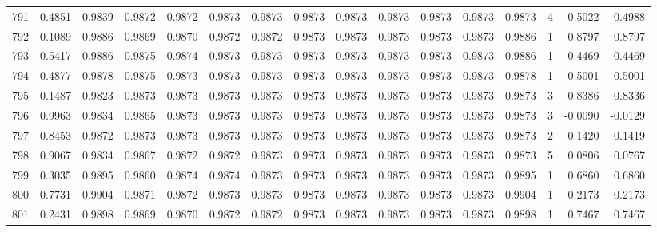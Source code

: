 \begin{tabular}{lrrrrrrrrrrrrrrr}
791 &      0.4851 &  0.9839 &  0.9872 &  0.9872 &  0.9873 &  0.9873 &  0.9873 &  0.9873 &  0.9873 &  0.9873 &   0.9873 &     0.9873 &      4 &                    0.5022 &                     0.4988 \\
792 &      0.1089 &  0.9886 &  0.9869 &  0.9870 &  0.9872 &  0.9872 &  0.9873 &  0.9873 &  0.9873 &  0.9873 &   0.9873 &     0.9886 &      1 &                    0.8797 &                     0.8797 \\
793 &      0.5417 &  0.9886 &  0.9875 &  0.9874 &  0.9873 &  0.9873 &  0.9873 &  0.9873 &  0.9873 &  0.9873 &   0.9873 &     0.9886 &      1 &                    0.4469 &                     0.4469 \\
794 &      0.4877 &  0.9878 &  0.9875 &  0.9873 &  0.9873 &  0.9873 &  0.9873 &  0.9873 &  0.9873 &  0.9873 &   0.9873 &     0.9878 &      1 &                    0.5001 &                     0.5001 \\
795 &      0.1487 &  0.9823 &  0.9873 &  0.9873 &  0.9873 &  0.9873 &  0.9873 &  0.9873 &  0.9873 &  0.9873 &   0.9873 &     0.9873 &      3 &                    0.8386 &                     0.8336 \\
796 &      0.9963 &  0.9834 &  0.9865 &  0.9873 &  0.9873 &  0.9873 &  0.9873 &  0.9873 &  0.9873 &  0.9873 &   0.9873 &     0.9873 &      3 &                   -0.0090 &                    -0.0129 \\
797 &      0.8453 &  0.9872 &  0.9873 &  0.9873 &  0.9873 &  0.9873 &  0.9873 &  0.9873 &  0.9873 &  0.9873 &   0.9873 &     0.9873 &      2 &                    0.1420 &                     0.1419 \\
798 &      0.9067 &  0.9834 &  0.9867 &  0.9872 &  0.9872 &  0.9873 &  0.9873 &  0.9873 &  0.9873 &  0.9873 &   0.9873 &     0.9873 &      5 &                    0.0806 &                     0.0767 \\
799 &      0.3035 &  0.9895 &  0.9860 &  0.9874 &  0.9874 &  0.9873 &  0.9873 &  0.9873 &  0.9873 &  0.9873 &   0.9873 &     0.9895 &      1 &                    0.6860 &                     0.6860 \\
800 &      0.7731 &  0.9904 &  0.9871 &  0.9872 &  0.9873 &  0.9873 &  0.9873 &  0.9873 &  0.9873 &  0.9873 &   0.9873 &     0.9904 &      1 &                    0.2173 &                     0.2173 \\
801 &      0.2431 &  0.9898 &  0.9869 &  0.9870 &  0.9872 &  0.9872 &  0.9873 &  0.9873 &  0.9873 &  0.9873 &   0.9873 &     0.9898 &      1 &                    0.7467 &                     0.7467 \\

\end{tabular}
